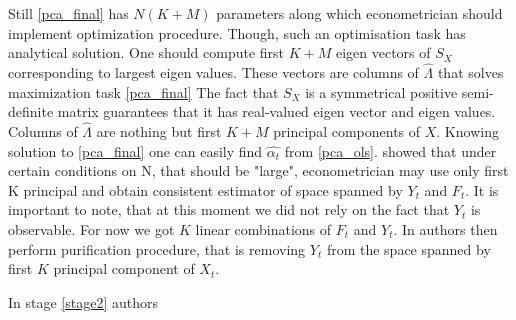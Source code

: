 \documentclass[a4paper, 14pt]{article}
\begin{document}
 Still \eqref{pca_final} has $N(K+M)$ parameters along which econometrician should implement optimization procedure. Though, such an optimisation task has analytical solution. One should compute first $K+M$ eigen vectors of $S_X$ corresponding to largest eigen values. These vectors are columns of $\hat{\Lambda}$ that solves maximization task \eqref{pca_final} The fact that $S_X$ is a symmetrical positive semi-definite matrix guarantees that it has real-valued eigen vector and eigen values. Columns of $\hat{\Lambda}$ are nothing but first $K+M$ principal components of $X$. Knowing solution to \eqref{pca_final} one can easily find $\hat{\alpha_t}$ from \eqref{pca_ols}. \cite{stock2002macroeconomic} showed that under certain conditions on N, that should be "large", econometrician may use only first K principal and obtain consistent estimator of space spanned by $Y_t$ and $F_t$. It is important to note, that at this moment we did not rely on the fact that $Y_t$ is observable. For now we got $K$ linear combinations of $F_t$ and $Y_t$. In \cite{bernanke2005measuring} authors then perform purification procedure, that is removing $Y_t$ from the space spanned by first $K$ principal component of $X_t$.
 
 In stage \ref{stage2} authors 












\newpage


\end{document}
